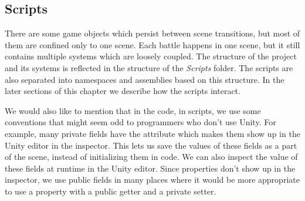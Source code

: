 \subsection{Scripts}

There are some game objects which persist between scene transitions, but most of them are confined only to one scene.
Each battle happens in one scene, but it still contains multiple systems which are loosely coupled.
The structure of the project and its systems is reflected in the structure of the \emph{Scripts} folder.
The scripts are also separated into namespaces and assemblies based on this structure.
In the later sections of this chapter we describe how the scripts interact.

We would also like to mention that in the code, in  scripts, we use some conventions that might seem odd to programmers who don't use Unity.
For example, many private fields have the attribute \mono{[SerializeField]} which makes them show up in the Unity editor in the inspector.
This lets us save the values of these fields as a part of the scene, instead of initializing them in code.
We can also inspect the value of these fields at runtime in the Unity editor.
Since properties don't show up in the inspector, we use public fields in many places where it would be more appropriate to use a property with a public getter and a private setter.

